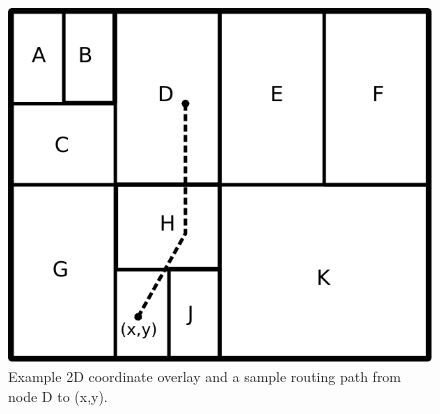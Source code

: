 \documentclass[acmcsur,acmnow]{acmtrans2m}
\begin{document}
\begin{figure}
\centering
  \includegraphics[scale=0.4]{img/algorithms/landmark_binning}
\caption{Example 2D coordinate overlay and a sample routing path from node D to (x,y).}
\label{fig:landmark_binning}
\end{figure}
\end{document}
